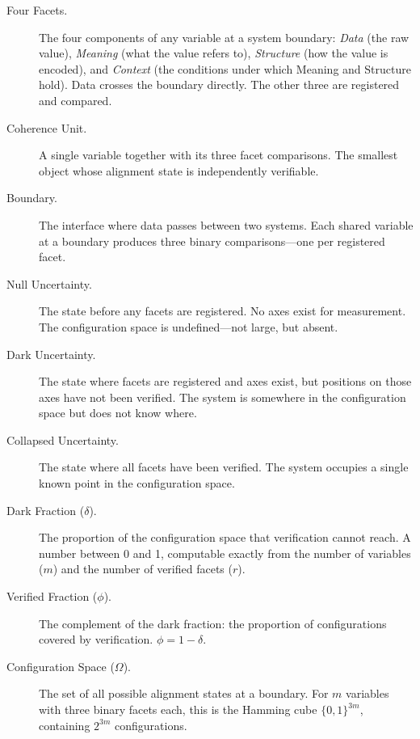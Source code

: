 \documentclass[11pt,a4paper]{article}
\begin{document}
\begin{description}

\item[Four Facets.] The four components of any variable at a system boundary: \emph{Data} (the raw value), \emph{Meaning} (what the value refers to), \emph{Structure} (how the value is encoded), and \emph{Context} (the conditions under which Meaning and Structure hold). Data crosses the boundary directly. The other three are registered and compared.

\item[Coherence Unit.] A single variable together with its three facet comparisons. The smallest object whose alignment state is independently verifiable.

\item[Boundary.] The interface where data passes between two systems. Each shared variable at a boundary produces three binary comparisons---one per registered facet.

\item[Null Uncertainty.] The state before any facets are registered. No axes exist for measurement. The configuration space is undefined---not large, but absent.

\item[Dark Uncertainty.] The state where facets are registered and axes exist, but positions on those axes have not been verified. The system is somewhere in the configuration space but does not know where.

\item[Collapsed Uncertainty.] The state where all facets have been verified. The system occupies a single known point in the configuration space.

\item[Dark Fraction ($\delta$).] The proportion of the configuration space that verification cannot reach. A number between 0 and 1, computable exactly from the number of variables ($m$) and the number of verified facets ($r$).

\item[Verified Fraction ($\phi$).] The complement of the dark fraction: the proportion of configurations covered by verification. $\phi = 1 - \delta$.

\item[Configuration Space ($\Omega$).] The set of all possible alignment states at a boundary. For $m$ variables with three binary facets each, this is the Hamming cube $\{0,1\}^{3m}$, containing $2^{3m}$ configurations.

\end{description}
\end{document}
